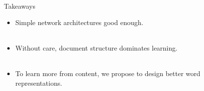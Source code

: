 \begin{frame}{Takeaways}

    \begin{itemize}
        \item Simple network architectures good enough. ~\\~\\
        \item Without care, document structure dominates learning. ~\\~\\
        \item To learn more from content, we propose to design better word 
            representations. ~\\~\\
    \end{itemize}

\end{frame}


%
%
